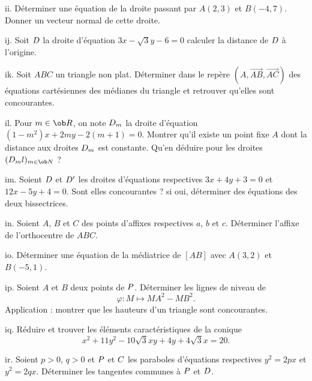 \exo  [Level=1,Fight=0,Learn=0,Field=\GéométriePlane,Type=\Exercices,Origin=] ii. 
Déterminer une équation de la droite passant par $A(2,3)$ et $B(-4,7)$. Donner un vecteur normal de cette droite. 

\exo  [Level=1,Fight=0,Learn=0,Field=\GéométriePlane,Type=\Exercices,Origin=] ij. 
Soit $\sc D$ la droite d'équation $3x-\sqrt3y-6=0$ calculer la distance de $\sc D$ à l'origine. 

\exo  [Level=1,Fight=0,Learn=0,Field=\GéométriePlane,Type=\Exercices,Origin=] ik. 
Soit $ABC$ un triangle non plat. Déterminer dans le repère $(A,\vec{AB},\vec{AC})$ des équations cartésiennes des médianes du triangle et retrouver qu'elles sont concourantes. 

\exo  [Level=1,Fight=1,Learn=0,Field=\GéométriePlane,Type=\Exercices,Origin=] 
il. Pour $m\in\ob R$, on note $\sc D_m$ la droite d'équation $(1-m^2)x+2my-2(m+1)=0$. 
Montrer qu'il existe un point fixe $A$ dont la distance aux droites $\sc D_m$ est constante. 
Qu'en déduire pour les droites $(\sc D_ml)_{m\in\ob N}$ ?

\exo  [Level=1,Fight=0,Learn=0,Field=\GéométriePlane,Type=\Exercices,Origin=] im. 
Soient $\sc D$ et $\sc D'$ les droites d'équations respectives $3x+4y+3=0$ et $12x-5y+4=0$. 
Sont elles concourantes ? si oui, déterminer des équations des deux bissectrices. 

\exo  [Level=1,Fight=0,Learn=0,Field=\GéométriePlane,Type=\Exercices,Origin=] in. 
Soient $A$, $B$ et $C$ des points d'affixes respectives $a$, $b$ et $c$. Déterminer l'affixe de l'orthocentre de $ABC$. 

\exo  [Level=1,Fight=0,Learn=0,Field=\GéométriePlane,Type=\Exercices,Origin=] io. 
Déterminer une équation de la médiatrice de $[AB]$ avec $A(3,2)$ et $B(-5,1)$. 

\exo  [Level=1,Fight=1,Learn=0,Field=\GéométriePlane,Type=\Exercices,Origin=] ip. 
Soient $A$ et  $B$ deux points de $\sc P$. Déterminer les lignes de niveau de 
$$
\varphi:M\mapsto MA^2-MB^2.
$$
Application : montrer que les hauteurs d'un triangle sont concourantes.  

\exo  [Level=1,Fight=0,Learn=0,Field=\Coniques,Type=\Exercices,Origin=] iq. 
Réduire et trouver les éléments caractéristiques de la conique 
$$
x^2+11y^2-10\sqrt3xy+4y+4\sqrt3x=20.
$$

\exo  [Level=1,Fight=1,Learn=0,Field=\Coniques,Type=\Exercices,Origin=] ir. 
Soient $p>0$, $q>0$ et $\sc P$ et $\sc C$ les paraboles d'équations respectives $y^2=2px$ et $y^2=2qx$. 
Déterminer les tangentes communes à $\sc P$ et $\sc D$. 
 
